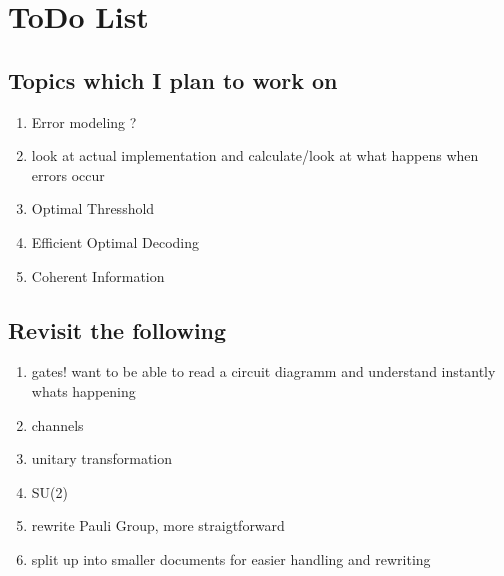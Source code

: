 \section{ToDo List}

\subsection{Topics which I plan to work on}

\begin{enumerate}
    \item Error modeling ? \cite{QECmemory}
    \item look at actual implementation and calculate/look at what happens when errors occur
    \item Optimal Thresshold
    \item Efficient Optimal Decoding
    \item Coherent Information
\end{enumerate}


\subsection{Revisit the following}

\begin{enumerate}
    \item gates! want to be able to read a circuit diagramm and understand instantly whats happening
    \item channels
    \item unitary transformation
    \item SU(2)
    \item rewrite Pauli Group, more straigtforward
    \item split up into smaller documents for easier handling and rewriting 
\end{enumerate}